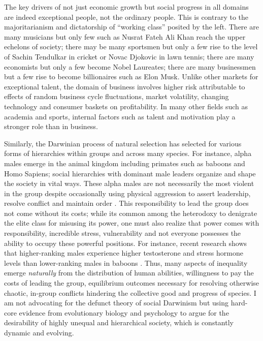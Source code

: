 \documentclass[12pt]{article}
\newcommand{\1}{\mathbbm 1}
\begin{document}
	    The key drivers of not just economic growth but social progress in all domains are indeed exceptional people, not the ordinary people. This is contrary to the majoritarianism and dictatorship of ``working class'' posited by the left. There are many musicians but only few such as Nusrat Fateh Ali Khan reach the upper echelons of society; there may be many sportsmen but only a few rise to the level of Sachin Tendulkar in cricket or Novac Djokovic in lawn tennis; there are many economists but only a few become Nobel Laureates; there are many businessmen but a few rise to become billionaires such as Elon Musk. Unlike other markets for exceptional talent, the domain of business involves higher risk attributable to effects of random business cycle fluctuations, market volatility, changing technology and consumer baskets on profitability. In many other fields such as academia and sports, internal factors such as talent and motivation play a stronger role than in business. 
	    
	    
	    Similarly, the Darwinian process of natural selection has selected for various forms of hierarchies within groups and across many species. For instance, alpha males emerge in the animal kingdom including primates such as baboons and Homo Sapiens; social hierarchies with dominant male leaders organize and shape the society in vital ways. These alpha males are not necessarily the most violent in the group \cite{peterson2002maps} despite occasionally using physical aggression to assert leadership, resolve conflict and maintain order \cite{peterson2002maps}. This responsibility to lead the group does not come without its costs; while its common among the heterodoxy to denigrate the elite class for misusing its power, one must also realize that power comes with responsibility, incredible stress, vulnerability and not everyone possesses the ability to occupy these powerful positions. For instance, recent research shows that higher-ranking males experience higher testosterone and stress hormone levels than lower-ranking males in baboons \cite{gesquiere2011life}. Thus, many aspects of inequality emerge \textit{naturally} from the distribution of human abilities, willingness to pay the costs of leading the group, equilibrium outcomes necessary for resolving otherwise chaotic, in-group conflicts hindering the collective good and progress of species. I am not advocating for the defunct theory of social Darwinism but using hard-core evidence from evolutionary biology and psychology to argue for the desirability of highly unequal and hierarchical society, which is constantly dynamic and evolving.
	    
\end{document}
